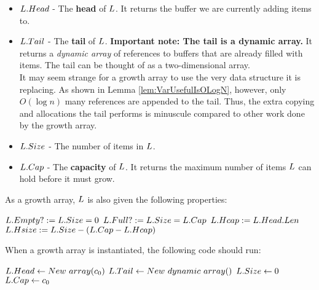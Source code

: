\begin{itemize}
	\item $L.Head$ - The \textbf{head} of $\VarList$. It returns the buffer we are currently adding items to.
	\item $L.Tail$ - The \textbf{tail} of $\VarList$. \textbf{Important note: The tail is a dynamic array.} It returns a \textit{dynamic array} of references to buffers that are already filled with items. The tail can be thought of as a two-dimensional array.\\
	{\HdrNote} It may seem strange for a growth array to use the very data structure it is replacing. As shown in Lemma \ref{lem:VarUsefulIsOLogN}, however, only $O(\log n)$ many references are appended to the tail. Thus, the extra copying and allocations the tail performs is minuscule compared to other work done by the growth array.
	\item $L.Size$ - The number of items in $\VarList$.
	\item $L.Cap$ - The \textbf{capacity} of $\VarList$. It returns the maximum number of items $\VarList$ can hold before it must grow.
\end{itemize}

As a growth array, $\VarList$ is also given the following properties:

\begin{algorithm}
	\begin{algorithmic}
		\State $L.Empty? := L.Size = 0$
		\State
		\State $L.Full? := L.Size = L.Cap$
		\State
		\State $L.Hcap := L.Head.Len$
		\State
		\State $L.Hsize := L.Size - \left(L.Cap - L.Hcap\right)$
	\end{algorithmic}
\end{algorithm}

When a growth array is instantiated, the following code should run:

\begin{algorithm}
	\begin{algorithmic}
		\Procedure{$\FuncConstructor$}{$\VarList$}
			\State $L.Head \gets New\ array(c_0)$
			\State $L.Tail \gets New\ dynamic\ array()$
			\State $L.Size \gets 0$
			\State $L.Cap \gets c_0$
		\EndProcedure
	\end{algorithmic}
\end{algorithm}